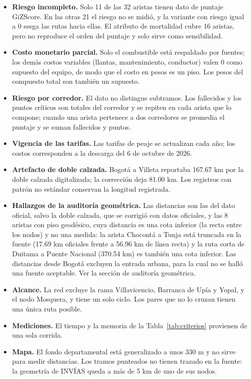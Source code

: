 \documentclass[12pt,a4paper]{article}
\begin{document}
\begin{itemize}
\item \textbf{Riesgo incompleto.} Solo 11 de las 32 aristas tienen dato de
puntaje GiZScore. En las otras 21 el riesgo no se midió, y la variante con
riesgo igual a 0 sesga las rutas hacia ellas. El atributo de mortalidad cubre
16 aristas, pero no reproduce el orden del puntaje y solo sirve como
sensibilidad.
\item \textbf{Costo monetario parcial.} Solo el combustible está respaldado por
fuentes; los demás costos variables (llantas, mantenimiento, conductor) valen
0 como supuesto del equipo, de modo que el costo en pesos es un piso. Los
pesos del compuesto total son también un supuesto.
\item \textbf{Riesgo por corredor.} El dato no distingue subtramos. Los
fallecidos y los puntos críticos son totales del corredor y se repiten en
cada arista que lo compone; cuando una arista pertenece a dos corredores se
promedia el puntaje y se suman fallecidos y puntos.
\item \textbf{Vigencia de las tarifas.} Las tarifas de peaje se actualizan
cada año; los costos corresponden a la descarga del 6 de octubre de 2026.
\item \textbf{Artefacto de doble calzada.} Bogotá a Villeta reportaba
167.67 km por la doble calzada digitalizada; la corrección deja 81.00 km. Los
registros con patrón no estándar conservan la longitud registrada.
\item \textbf{Hallazgos de la auditoría geométrica.} Las distancias son las
del dato oficial, salvo la doble calzada, que se corrigió con datos oficiales,
y las 8 aristas con piso geodésico, cuya distancia es una cota inferior (la
recta entre los nodos) y no una medida: la arista Chocontá a Tunja está
truncada en la fuente (17.69 km oficiales frente a 56.96 km de línea recta) y
la ruta corta de Duitama a Puente Nacional (370.54 km) es también una cota
inferior. Las distancias desde Bogotá excluyen la entrada urbana, para la cual
no se halló una fuente aceptable. Ver la sección de auditoría geométrica.
\item \textbf{Alcance.} La red excluye la rama Villavicencio, Barranca de
Upía y Yopal, y el nodo Mosquera, y tiene un solo ciclo. Los pares que no lo
cruzan tienen una única ruta posible.
\item \textbf{Mediciones.} El tiempo y la memoria de la
Tabla~\ref{tab:criterios} provienen de una sola corrida.
\item \textbf{Mapa.} El fondo departamental está generalizado a unos 330 m y
no sirve para medir distancias. Los tramos punteados no tienen trazado en la
fuente: la geometría de INVÍAS queda a más de 5 km de uno de sus nodos.
\end{itemize}
\end{document}
